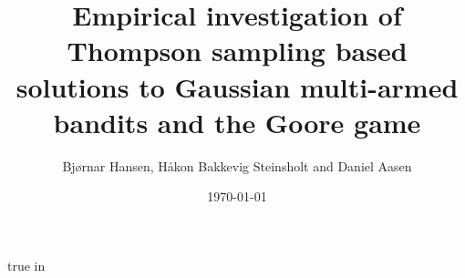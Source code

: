 \documentclass[12pt,a4paper,final]{report}
\author{Bjørnar Hansen, Håkon Bakkevig Steinsholt and Daniel Aasen}
\title{Empirical investigation of Thompson sampling based solutions to Gaussian multi-armed bandits and the Goore game}
\date{\today} %
\theoremstyle{definition}
\begin{document}
    \maketitle

    \newpage    
    
%   

    \tableofcontents
    \listoffigures
    \listoftables

     true in

    \newpage

        
                
    
    
    

    \begin{singlespace}
        
        
    \end{singlespace}

    \printglossary
\end{document}
